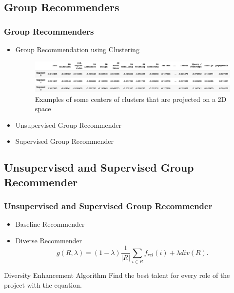 \documentclass{beamer}
\begin{document}
\subsection{Group Recommenders} 
\begin{frame}
\frametitle{Group Recommenders}
\begin{itemize}
	\item Group Recommendation using Clustering
	\begin{figure}
		\includegraphics[scale=0.2]{images/ClusterCentersMatrix} 
		\caption{Examples of some centers of clusters that are projected on a 2D space}
	\end{figure}
	\item Unsupervised Group Recommender
	\item Supervised Group Recommender
\end{itemize} 
\end{frame}


\subsection{Unsupervised and Supervised Group Recommender} 
\begin{frame}
\frametitle{Unsupervised and Supervised Group Recommender}
   \begin{itemize}
	\item Baseline Recommender
	\item Diverse Recommender
	\begin{equation}
	g ( R , \lambda ) = ( 1 - \lambda ) \frac { 1 } { | R | } \sum _ { i \in R } f _ { r e l } ( i ) + \lambda d i v ( R ) .
	\label{eq:diversity-equation}
	\end{equation}
\end{itemize} 
   \begin{block}{Diversity Enhancement Algorithm}
	Find the best talent for every role of the project with the equation.
\end{block}
\end{frame}
\end{document}
